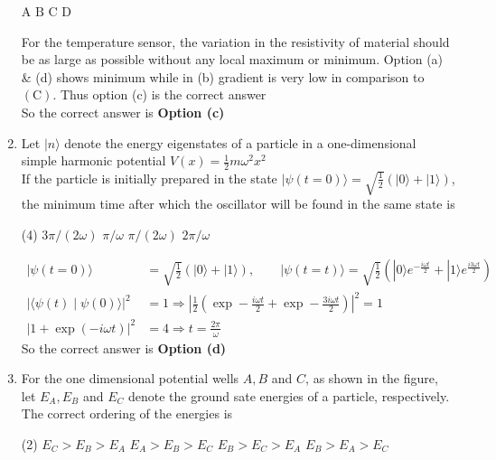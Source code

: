 \begin{enumerate}
\begin{tasks}
	\task[\textbf{a.}]$\mathrm{A}$
	\task[\textbf{b.}]$\mathrm{B}$
	\task[\textbf{c.}]$\mathrm{C}$
	\task[\textbf{d.}] D
\end{tasks}	
\begin{answer}
 For the temperature sensor, the variation in the resistivity of material should be as large as possible without any local maximum or minimum. Option (a) \& (d) shows minimum while in (b) gradient is very low in comparison to $(\mathrm{C})$. Thus option (c) is the correct answer\\
		So the correct answer is \textbf{Option (c)}
\end{answer}
\item  Let $|n\rangle$ denote the energy eigenstates of a particle in a one-dimensional simple harmonic potential $V(x)=\frac{1}{2} m \omega^{2} x^{2}$\\
If the particle is initially prepared in the state $|\psi(t=0)\rangle=\sqrt{\frac{1}{2}}(|0\rangle+|1\rangle)$, the minimum time after which the oscillator will be found in the same state is
 \begin{tasks}(4)
	\task[\textbf{a.}]$3 \pi /(2 \omega)$
	\task[\textbf{b.}]$\pi / \omega$
	\task[\textbf{c.}]$\pi /(2 \omega)$
	\task[\textbf{d.}] $2 \pi / \omega$
\end{tasks}
\begin{answer}
	\begin{align*}
	|\psi(t=0)\rangle&=\sqrt{\frac{1}{2}}(|0\rangle+|1\rangle), \qquad|\psi(t=t)\rangle=\sqrt{\frac{1}{2}}\left(|0\rangle e^{-\frac{i \omega t}{2}}+|1\rangle e^{\frac{i 3 \omega t}{2}}\right)\\
	|\langle\psi(t) \mid \psi(0)\rangle|^{2}&=1 \Rightarrow\left|\frac{1}{2}\left(\exp -\frac{i \omega t}{2}+\exp -\frac{3 i \omega t}{2}\right)\right|^{2}=1 \\
	|1+\exp (-i \omega t)|^{2}&=4 \Rightarrow t=\frac{2 \pi}{\omega}
	\end{align*}
		So the correct answer is \textbf{Option (d)}
\end{answer}
\item  For the one dimensional potential wells $A, B$ and $C$, as shown in the figure, let $E_{A}, E_{B}$ and $E_{C}$ denote the ground sate energies of a particle, respectively.	
The correct ordering of the energies is
 \begin{tasks}(2)
	\task[\textbf{a.}] $E_{C}>E_{B}>E_{A}$
	\task[\textbf{b.}]$E_{A}>E_{B}>E_{C}$
	\task[\textbf{c.}]$E_{B}>E_{C}>E_{A}$
	\task[\textbf{d.}] $E_{B}>E_{A}>E_{C}$
\end{tasks}

\end{enumerate}
